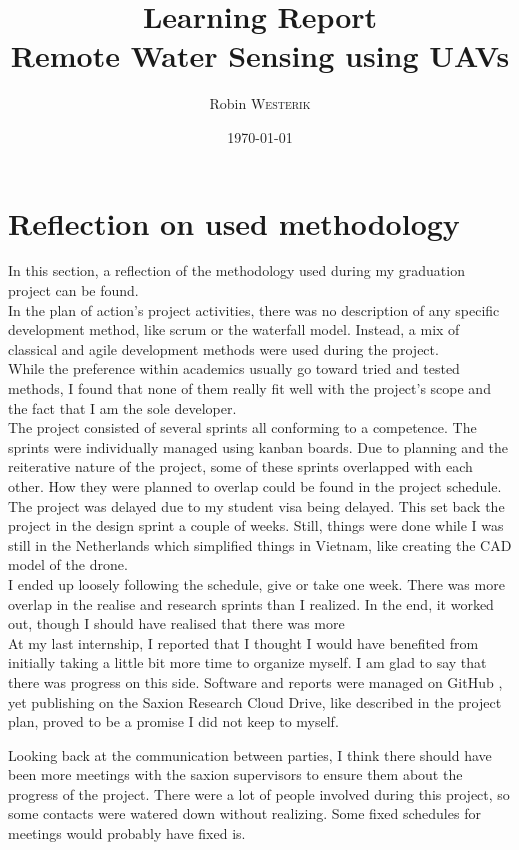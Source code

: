 \documentclass[11pt, a4paper]{article}
\title{Learning Report\\Remote Water Sensing using UAVs}
\author{Robin \textsc{Westerik}}
\date{\today}
\begin{document}


\tableofcontents
\pagebreak

\section{Reflection on used methodology}
In this section, a reflection of the methodology used during my graduation project can be found.\\

\noindent In the plan of action's project activities, there was no description of any specific development method, like scrum or the waterfall model. Instead, a mix of classical and agile development methods were used during the project.\\

While the preference within academics usually go toward tried and tested methods, I found that none of them really fit well with the project's scope and the fact that I am the sole developer.\\

The project consisted of several sprints all conforming to a competence. The sprints were individually managed using kanban \cite{kanban} boards. Due to planning and the reiterative nature of the project, some of these sprints overlapped with each other. How they were planned to overlap could be found in the project schedule.\\

The project was delayed due to my student visa being delayed. This set back the project in the design sprint a couple of weeks. Still, things were done while I was still in the Netherlands which simplified things in Vietnam, like creating the CAD model of the drone.\\

I ended up loosely following the schedule, give or take one week. There was more overlap in the realise and research sprints than I realized. In the end, it worked out, though I should have realised that there was more \\

At my last internship, I reported that I thought I would have benefited from initially taking a little bit more time to organize myself. I am glad to say that there was progress on this side. Software and reports were managed on GitHub \cite{git}, yet publishing on the Saxion Research Cloud Drive, like described in the project plan, proved to be a promise I did not keep to myself. 

Looking back at the communication between parties, I think there should have been more meetings with the saxion supervisors to ensure them about the progress of the project. There were a lot of people involved during this project, so some contacts were watered down without realizing. Some fixed schedules for meetings would probably have fixed is.
\end{document}
